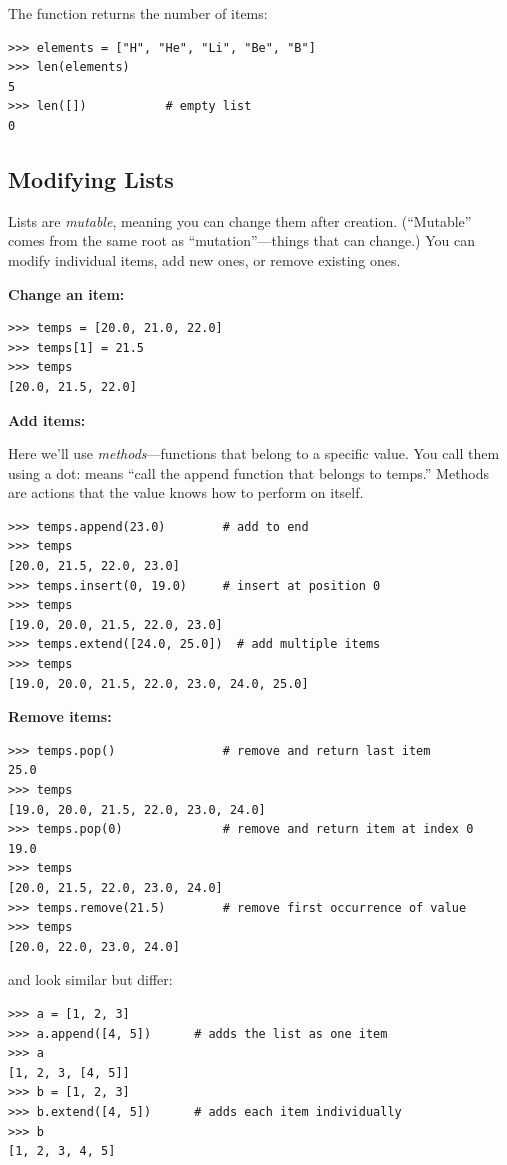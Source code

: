 The  function returns the number of items:

\begin{lstlisting}
>>> elements = ["H", "He", "Li", "Be", "B"]
>>> len(elements)
5
>>> len([])           # empty list
0
\end{lstlisting}

\subsection{Modifying Lists}

Lists are \emph{mutable}, meaning you can change them after creation. (``Mutable'' comes from the same root as ``mutation''---things that can change.) You can modify individual items, add new ones, or remove existing ones.

\textbf{Change an item:}
\begin{lstlisting}
>>> temps = [20.0, 21.0, 22.0]
>>> temps[1] = 21.5
>>> temps
[20.0, 21.5, 22.0]
\end{lstlisting}

\textbf{Add items:}

Here we'll use \emph{methods}---functions that belong to a specific value. You call them using a dot:  means ``call the append function that belongs to temps.'' Methods are actions that the value knows how to perform on itself.

\begin{lstlisting}
>>> temps.append(23.0)        # add to end
>>> temps
[20.0, 21.5, 22.0, 23.0]
>>> temps.insert(0, 19.0)     # insert at position 0
>>> temps
[19.0, 20.0, 21.5, 22.0, 23.0]
>>> temps.extend([24.0, 25.0])  # add multiple items
>>> temps
[19.0, 20.0, 21.5, 22.0, 23.0, 24.0, 25.0]
\end{lstlisting}

\textbf{Remove items:}
\begin{lstlisting}
>>> temps.pop()               # remove and return last item
25.0
>>> temps
[19.0, 20.0, 21.5, 22.0, 23.0, 24.0]
>>> temps.pop(0)              # remove and return item at index 0
19.0
>>> temps
[20.0, 21.5, 22.0, 23.0, 24.0]
>>> temps.remove(21.5)        # remove first occurrence of value
>>> temps
[20.0, 22.0, 23.0, 24.0]
\end{lstlisting}

\begin{warning}
 and  look similar but differ:
\begin{lstlisting}
>>> a = [1, 2, 3]
>>> a.append([4, 5])      # adds the list as one item
>>> a
[1, 2, 3, [4, 5]]
>>> b = [1, 2, 3]
>>> b.extend([4, 5])      # adds each item individually
>>> b
[1, 2, 3, 4, 5]
\end{lstlisting}
\end{warning}


